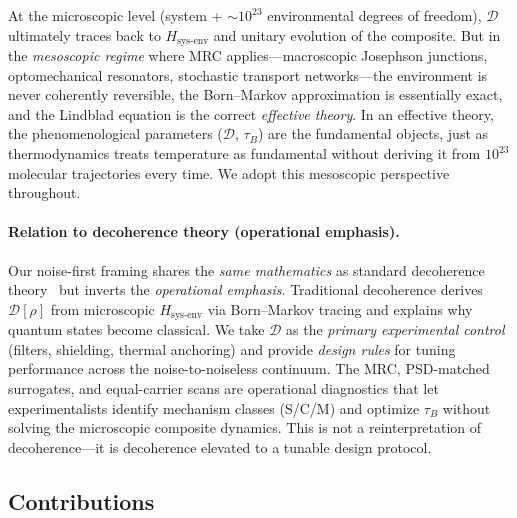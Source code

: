 \documentclass[11pt,letterpaper]{article}
\begin{document}
At the microscopic level (system + $\sim 10^{23}$ environmental degrees
of freedom), $\mathcal{D}$ ultimately traces back to $H_{\text{sys-env}}$
and unitary evolution of the composite. But in the \emph{mesoscopic
regime} where MRC applies---macroscopic Josephson junctions,
optomechanical resonators, stochastic transport networks---the
environment is never coherently reversible, the Born--Markov
approximation is essentially exact, and the Lindblad equation is the
correct \emph{effective theory}. In an effective theory, the
phenomenological parameters ($\mathcal{D}$, $\tau_B$) are the
fundamental objects, just as thermodynamics treats temperature as
fundamental without deriving it from $10^{23}$ molecular trajectories
every time. We adopt this mesoscopic perspective throughout.

\paragraph{Relation to decoherence theory (operational emphasis).}
Our noise-first framing shares the \emph{same mathematics} as standard
decoherence theory~\cite{Schlosshauer2019} but inverts the
\emph{operational emphasis}. Traditional decoherence derives
$\mathcal{D}[\rho]$ from microscopic $H_{\text{sys-env}}$ via
Born--Markov tracing and explains why quantum states become classical.
We take $\mathcal{D}$ as the \emph{primary experimental control}
(filters, shielding, thermal anchoring) and provide \emph{design rules}
for tuning performance across the noise-to-noiseless continuum. The MRC,
PSD-matched surrogates, and equal-carrier scans are operational
diagnostics that let experimentalists identify mechanism classes (S/C/M)
and optimize $\tau_B$ without solving the microscopic composite dynamics.
This is not a reinterpretation of decoherence—it is decoherence elevated
to a tunable design protocol.

\subsection{Contributions}
\end{document}
